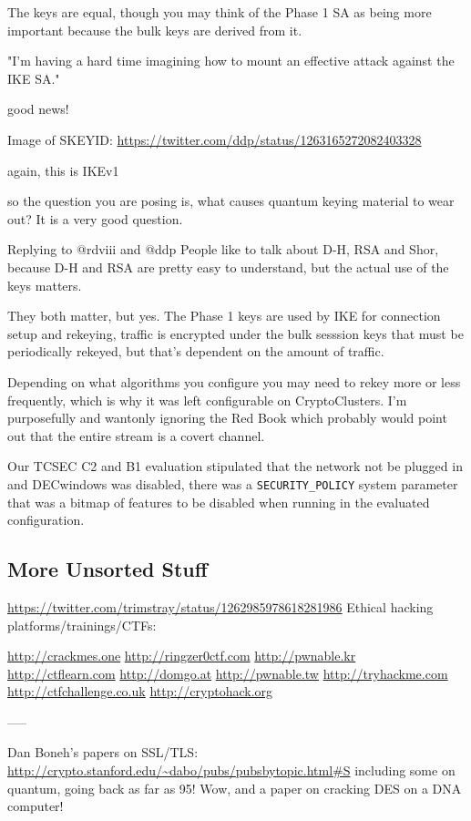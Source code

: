 \documentclass[%
 aip,
 jmp,%
 amsmath,amssymb,
 reprint,%
]{revtex4-1}
\begin{document}
The keys are equal, though you may think of the Phase 1 SA as being
more important because the bulk keys are derived from it.

"I'm having a hard time imagining how to mount an effective attack against the IKE SA."

good news!

Image of SKEYID:
\url{https://twitter.com/ddp/status/1263165272082403328}

again, this is IKEv1

so the question you are posing is, what causes quantum keying material
to wear out?  It is a very good question.

Replying to 
@rdviii
 and 
@ddp
People like to talk about D-H, RSA and Shor, because D-H and RSA are
pretty easy to understand, but the actual use of the keys matters.


They both matter, but yes.  The Phase 1 keys are used by IKE for
connection setup and rekeying, traffic is encrypted under the bulk
sesssion keys that must be periodically rekeyed, but that's dependent
on the amount of traffic.

Depending on what algorithms you configure you may need to rekey more or less frequently, which is why it was left configurable on CryptoClusters.  I'm purposefully and wantonly ignoring the Red Book which probably would point out that the entire stream is a covert channel.

Our TCSEC C2 and B1 evaluation stipulated that the network not be
plugged in and DECwindows was disabled, there was a \verb|SECURITY_POLICY|
system parameter that was a bitmap of features to be disabled when
running in the evaluated configuration.

\subsection{More Unsorted Stuff}

\url{https://twitter.com/trimstray/status/1262985978618281986}
Ethical hacking platforms/trainings/CTFs:

\url{http://crackmes.one}
\url{http://ringzer0ctf.com}
\url{http://pwnable.kr}
\url{http://ctflearn.com}
\url{http://domgo.at}
\url{http://pwnable.tw}
\url{http://tryhackme.com}
\url{http://ctfchallenge.co.uk}
\url{http://cryptohack.org}

-----

Dan Boneh's papers on SSL/TLS:
\url{http://crypto.stanford.edu/~dabo/pubs/pubsbytopic.html#S}
including some on quantum, going back as far as 95!
Wow, and a paper on cracking DES on a DNA computer!
\end{document}
